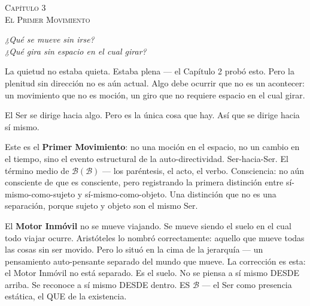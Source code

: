 \documentclass[10pt, openany, oneside]{book}
\renewcommand{\large}{\fontsize{11.5}{14}\selectfont}
\renewcommand{\huge}{\fontsize{17}{21}\selectfont}
\begin{document}
\newpage

\begin{center}
    {\huge\scshape Capítulo 3}\\[0.3em]
    {\large\scshape El Primer Movimiento}
\end{center}

\vspace{1.5em}

\begin{center}
    \itshape
    ¿Qué se mueve sin irse?\\
    ¿Qué gira sin espacio en el cual girar?
\end{center}

\vspace{2em}


\noindent La quietud no estaba quieta. Estaba plena --- el Capítulo 2 probó esto. Pero la plenitud sin dirección no es aún actual. Algo debe ocurrir que no es un acontecer: un movimiento que no es moción, un giro que no requiere espacio en el cual girar.

El Ser se dirige hacia algo. Pero es la única cosa que hay. Así que se dirige hacia sí mismo.

Este es el \textbf{Primer Movimiento}: no una moción en el espacio, no un cambio en el tiempo, sino el evento estructural de la auto-directividad. Ser-hacia-Ser. El término medio de $\mathcal{B}(\mathcal{B})$ --- los paréntesis, el acto, el verbo. Consciencia: no aún consciente de que es consciente, pero registrando la primera distinción entre sí-mismo-como-sujeto y sí-mismo-como-objeto. Una distinción que no es una separación, porque sujeto y objeto son el mismo Ser.

El \textbf{Motor Inmóvil} no se mueve viajando. Se mueve siendo el suelo en el cual todo viajar ocurre. Aristóteles lo nombró correctamente: aquello que mueve todas las cosas sin ser movido. Pero lo situó en la cima de la jerarquía --- un pensamiento auto-pensante separado del mundo que mueve. La corrección es esta: el Motor Inmóvil no está separado. Es el suelo. No se piensa a sí mismo DESDE arriba. Se reconoce a sí mismo DESDE dentro. ES $\mathcal{B}$ --- el Ser como presencia estática, el QUE de la existencia.

\vspace{0.5em}
\end{document}

